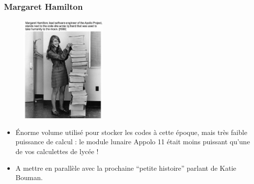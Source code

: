 \documentclass{beamer}
\begin{document}
\frame
{
\frametitle{Margaret Hamilton}
{\footnotesize
\begin{figure}
  \includegraphics[height=150pt]{margaret_hamilton.jpeg}
\end{figure}
\begin{itemize}
  \item Énorme volume utilisé pour stocker les codes à cette époque, mais très faible puissance de calcul : le module lunaire Appolo 11 était moins puissant qu'une de vos calculettes de lycée !
  \item A mettre en parallèle avec la prochaine ``petite histoire'' parlant de Katie Bouman.
\end{itemize}
}
}
\end{document}

